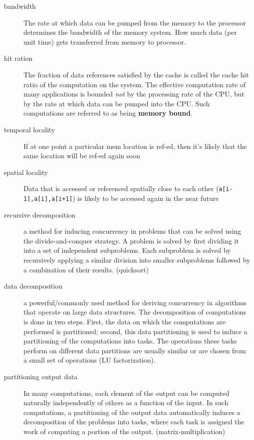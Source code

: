 \begin{description}
\item[bandwidth] The rate at which data can be pumped from the memory to the processor determines the bandwidth of the memory system.  How much data (per unit time) gets transferred from memory to processor.


\item[hit ration] The fraction of data references satisfied by the cache is called the cache hit ratio of the computation on the system.   The effective computation rate of many applications is bounded \emph{not} by the processing rate of the CPU, but by the rate at which data can be pumped into the CPU.  Such computations are referred to as being \textbf{memory bound}.


\item[temporal locality] If at one point a particular mem location is ref-ed, then it's likely that the same location will be ref-ed again soon

\item[spatial locality] Data that is accessed or referenced spatially close to each other (\texttt{a[i-1],a[i],a[i+1]}) is likely to be accessed again in the near future

\item[recursive decomposition] a method for inducing concurrency in problems that can be solved using the divide-and-conquer strategy.  A problem is solved by first dividing it into a set of independent subproblems. Each subproblem is solved by recursively applying a similar division into smaller subproblems followed by a combination of their results. (quicksort)


\item[data decomposition] a powerful/commonly used method for deriving concurrency in algorithms that operate on large data structures.  The decomposition of computations is done in two steps.  First, the data on which the computations are performed is partitioned; second, this data partitioning is used to induce a partitioning of the computations into tasks. The operations these tasks perform on different data partitions are usually similar or are chosen from a small set of operations (LU factorization).


\item[partitioning output data] In many computations, each element of the output can be computed naturally independently of others as a function of the input. In such computations, a partitioning of the output data automatically induces a decomposition of the problems into tasks, where each task is assigned the work of computing a portion of the output. (matrix-multiplication)



\end{description}

